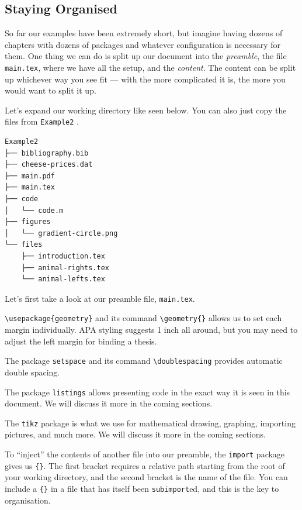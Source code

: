 \subsection{Staying Organised}
So far our examples have been extremely short, but imagine having dozens of chapters with dozens of packages and whatever configuration is necessary for them.
One thing we can do is split up our document into the \emph{preamble}, the file \verb|main.tex|, where we have all the setup, and the \emph{content}.
The content can be split up whichever way you see fit --- with the more complicated it is, the more you would want to split it up. 

Let's expand our working directory like seen below. You can also just copy the files from \verb|Example2| .
\begin{verbatim}
Example2
├── bibliography.bib
├── cheese-prices.dat
├── main.pdf
├── main.tex
├── code
│   └── code.m
├── figures
│   └── gradient-circle.png
└── files
    ├── introduction.tex
    ├── animal-rights.tex
    └── animal-lefts.tex
\end{verbatim}

Let's first take a look at our preamble file, \verb|main.tex|.



\verb|\usepackage{geometry}| and its command \verb|\geometry{}| allows us to set each margin individually.
APA styling suggests 1 inch all around, but you may need to adjust the left margin for binding a thesis.

The package \verb|setspace| and its command \verb|\doublespacing| provides automatic double spacing.

The package \verb|listings| allows presenting code in the exact way it is seen in this document. We will discuss it more in the coming sections.

The \verb|tikz| package is what we use for mathematical drawing, graphing, importing pictures, and much more.
We will discuss it more in the coming sections.

To ``inject'' the contents of another file into our preamble, the \verb|import| package gives us \verb|{}|.
The first bracket requires a relative path starting from the root of your working directory, and the second bracket is the name of the file.
You can include a \verb|{}| in a file that has itself been \texttt{subimport}ed, and this is the key to organisation.

